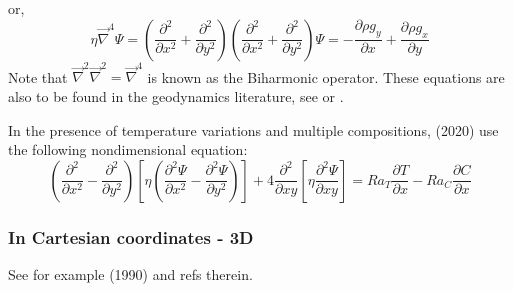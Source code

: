 or, 
\begin{equation}
\eta {\vec \nabla}^4 \Psi 
=
\left(\frac{\partial^2 }{\partial x^2} + \frac{\partial^2 }{\partial y^2} \right) 
\left(\frac{\partial^2 }{\partial x^2} + \frac{\partial^2 }{\partial y^2} \right) \Psi
=
-\frac{\partial \rho g_y}{\partial x} + \frac{\partial \rho g_x}{\partial y}   
\label{eq:sf1}
\end{equation}
Note that $\vec\nabla^2 \vec\nabla^2 = \vec\nabla^4 $ is known as the {\color{olive}Biharmonic operator}.
These equations are also to be found in the geodynamics literature, 
see \cite[eq. 1.43]{tack10} or \cite[p 70-71]{gery10}.

In the presence of temperature variations and multiple compositions, 
\textcite{trlb20} (2020)  use the  following nondimensional equation:
\[
\left(
\frac{\partial^2 }{\partial x^2} - 
\frac{\partial^2 }{\partial y^2}  
\right)
\left[ \eta
\left(
\frac{\partial^2 \Psi}{\partial x^2} - 
\frac{\partial^2 \Psi}{\partial y^2}  
\right)
\right]
+4
\frac{\partial^2 }{\partial xy} 
\left[
\eta 
\frac{\partial^2 \Psi}{\partial xy} 
\right]
=
Ra_T \frac{\partial T}{\partial x}-
Ra_C \frac{\partial C}{\partial x}
\]





\subsubsection{In Cartesian coordinates - 3D}

See for example \textcite{hous90} (1990) and refs therein.


